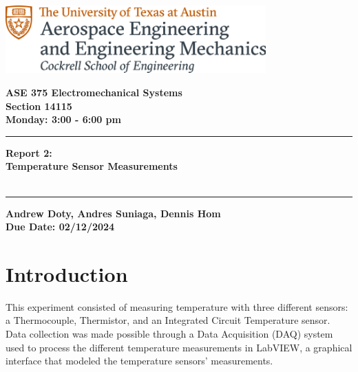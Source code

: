 \documentclass{article}
\begin{document}
\begin{titlepage}
  \centering
  \includegraphics[width=10cm]{ase-logo-formal.png}  %
  \vspace{1cm}  %
 
  \Large \textbf{ASE 375 Electromechanical Systems}\\
  \large \textbf{Section 14115}\\
  \vspace{0.5cm}
  \textbf{Monday: 3:00 - 6:00 pm}\\
 
  \vspace{1cm}
 
  \hrule
  \vspace{0.5cm}
 
  \Huge \textbf{Report 2:\\
  Temperature Sensor Measurements}\\
  \Huge \textbf{}\\
 
  \vspace{0.5cm}
  \hrule
 
  \vspace{1cm}
 
  \normalsize \textbf{Andrew Doty, Andres Suniaga, Dennis Hom}\\
  \normalsize \textbf{Due Date: 02/12/2024}
 
\end{titlepage}
\newpage

\tableofcontents
\thispagestyle{empty}
\newpage



\section{Introduction}
This experiment consisted of measuring temperature with three different sensors: a Thermocouple, Thermistor, and an Integrated Circuit Temperature sensor. Data collection was made possible through a Data Acquisition (DAQ) system used to process the different temperature measurements in LabVIEW, a graphical interface that modeled the temperature sensors' measurements. 
\end{document}
